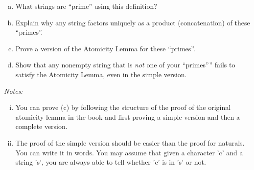 \documentclass[12pt]{article}
\begin{document}
	\begin{enumerate}[(a)]
		\item What strings are “prime” using this definition?

		\item Explain why any string factors uniquely as a product (concatenation) of
			these “primes”.

		\item Prove a version of the Atomicity Lemma for these “primes”.

		\item Show that any nonempty string that is \textit{not} one of your
			“primes”” fails to satisfy the Atomicity Lemma, even in the simple version.
	\end{enumerate}
	{\itshape Notes: \begin{enumerate}[(i)]\item You can prove (c) by following the structure of the proof of the original atomicity lemma in the book and first proving a simple version and then a complete version.

	\item The proof of the simple version should be easier than the proof for naturals. You can write it in words. You may assume that given a character 'c' and a string 's', you are always able to tell whether 'c' is in 's' or not.\end{enumerate} }
\end{document}
